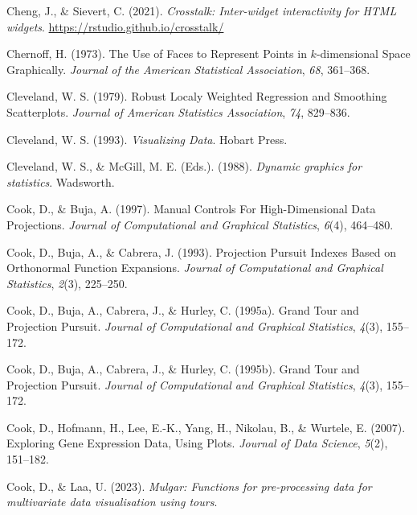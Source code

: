 \documentclass[
  letterpaper,
]{krantz}
\newlength{\cslhangindent}
\newlength{\cslentryspacingunit} %
\newenvironment{CSLReferences}[2] %
 {%
  \setlength{\parindent}{0pt}
  \ifodd #1
  \let\oldpar\par
  \def\par{\hangindent=\cslhangindent\oldpar}
  \fi
  \setlength{\parskip}{#2\cslentryspacingunit}
 }%
 {}
\begin{document}
\begin{CSLReferences}{1}{0}
\leavevmode{}%
Cheng, J., \& Sievert, C. (2021). \emph{Crosstalk: Inter-widget
interactivity for HTML widgets}.
\url{https://rstudio.github.io/crosstalk/}

\leavevmode{}%
Chernoff, H. (1973). The {U}se of {F}aces to {R}epresent {P}oints in
\(k\)-dimensional {S}pace {G}raphically. \emph{Journal of the American
Statistical Association}, \emph{68}, 361--368.

\leavevmode{}%
Cleveland, W. S. (1979). Robust {L}ocaly {W}eighted {R}egression and
{S}moothing {S}catterplots. \emph{Journal of American Statistics
Association}, \emph{74}, 829--836.

\leavevmode{}%
Cleveland, W. S. (1993). \emph{Visualizing {D}ata}. Hobart Press.

\leavevmode{}%
Cleveland, W. S., \& McGill, M. E. (Eds.). (1988). \emph{Dynamic
graphics for statistics}. Wadsworth.

\leavevmode{}%
Cook, D., \& Buja, A. (1997). {M}anual {C}ontrols {F}or
{H}igh-{D}imensional {D}ata {P}rojections. \emph{Journal of
Computational and Graphical Statistics}, \emph{6}(4), 464--480.

\leavevmode{}%
Cook, D., Buja, A., \& Cabrera, J. (1993). {P}rojection {P}ursuit
{I}ndexes {B}ased on {O}rthonormal {F}unction {E}xpansions.
\emph{Journal of Computational and Graphical Statistics}, \emph{2}(3),
225--250.

\leavevmode{}%
Cook, D., Buja, A., Cabrera, J., \& Hurley, C. (1995a). Grand {T}our and
{P}rojection {P}ursuit. \emph{Journal of Computational and Graphical
Statistics}, \emph{4}(3), 155--172.

\leavevmode{}%
Cook, D., Buja, A., Cabrera, J., \& Hurley, C. (1995b). Grand {T}our and
{P}rojection {P}ursuit. \emph{Journal of Computational and Graphical
Statistics}, \emph{4}(3), 155--172.

\leavevmode{}%
Cook, D., Hofmann, H., Lee, E.-K., Yang, H., Nikolau, B., \& Wurtele, E.
(2007). Exploring {G}ene {E}xpression {D}ata, {U}sing {P}lots.
\emph{Journal of Data Science}, \emph{5}(2), 151--182.

\leavevmode{}%
Cook, D., \& Laa, U. (2023). \emph{Mulgar: Functions for pre-processing
data for multivariate data visualisation using tours}.


\end{CSLReferences}
\end{document}
